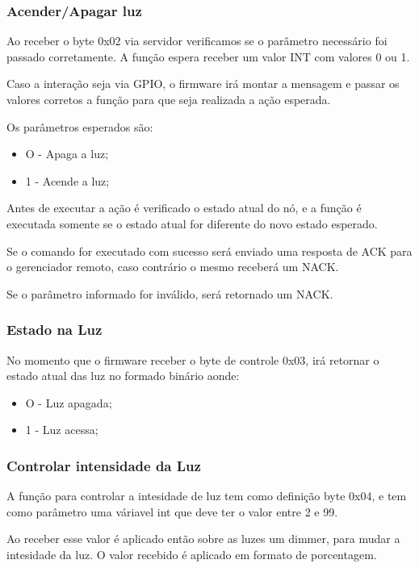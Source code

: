\documentclass[openright]{normas-utf-tex} %
\begin{document}
\subsubsection{Acender/Apagar luz}

Ao receber o byte 0x02 via servidor verificamos se o parâmetro necessário foi passado corretamente. A função espera receber um valor INT com valores 0 ou 1.

Caso a interação seja via GPIO, o firmware irá montar a mensagem e passar os valores corretos a função para que seja realizada a ação esperada.

Os parâmetros esperados são:
\begin{itemize}
    \item O - Apaga a luz;
    \item 1 - Acende a luz;
\end{itemize}

Antes de executar a ação é verificado o estado atual do nó, e a função é executada somente se o estado atual for diferente do novo estado esperado.

Se o comando for executado com sucesso será enviado uma resposta de ACK para o gerenciador remoto, caso contrário o mesmo receberá um NACK.

Se o parâmetro informado for inválido, será retornado um NACK.

\subsubsection{Estado na Luz}

No momento que o firmware receber o byte de controle 0x03, irá retornar o estado atual das luz no formado binário aonde:

\begin{itemize}
    \item O - Luz apagada;
    \item 1 - Luz acessa;
\end{itemize}

\subsubsection{Controlar intensidade da Luz}
A função para controlar a intesidade de luz tem como definição byte 0x04, e tem como parâmetro uma váriavel int que deve ter o valor entre 2 e 99.

Ao receber esse valor é aplicado então sobre as luzes um dimmer, para mudar a intesidade da luz. O valor recebido é aplicado em formato de porcentagem.
\end{document}
